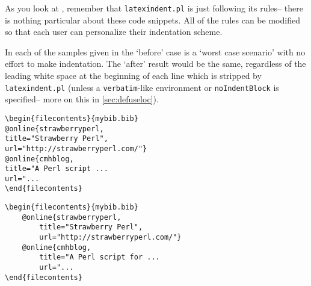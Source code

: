 As you look at , remember
that \lstinline!latexindent.pl! is just following its rules-- there is nothing 
particular about these code snippets. All of the rules can be modified 
so that each user can personalize their indentation scheme. 

In each of the samples given in 
the `before' case is a `worst case scenario' with no effort to make indentation. The `after'
result would be the same, regardless of the leading white space at the beginning of 
each line which is stripped by \lstinline!latexindent.pl! (unless a \lstinline!verbatim!-like
environment or \lstinline!noIndentBlock! is specified-- more on this in \cref{sec:defuseloc}).

\begin{adjustwidth}{-2cm}{2cm}
	\begin{minipage}{.5\textwidth}
		\begin{lstlisting}[style=demo,caption={\lstinline!filecontents! before},label={lst:filecontentsbefore}]
\begin{filecontents}{mybib.bib}
@online{strawberryperl,
title="Strawberry Perl",
url="http://strawberryperl.com/"}
@online{cmhblog,
title="A Perl script ...
url="...
\end{filecontents}
		\end{lstlisting}
	\end{minipage}%
	\begin{minipage}{.5\textwidth}
		\begin{lstlisting}[style=demo,caption={\lstinline!filecontents! after}]
\begin{filecontents}{mybib.bib}
	@online{strawberryperl,
		title="Strawberry Perl",
		url="http://strawberryperl.com/"}
	@online{cmhblog,
		title="A Perl script for ...
		url="...
\end{filecontents}
		\end{lstlisting}
	\end{minipage}
													 	 	 	 	 				

\end{adjustwidth}

